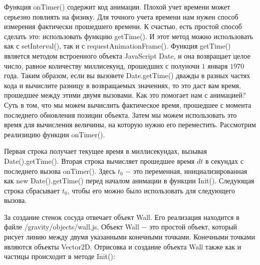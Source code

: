 Функция onTimer() содержит код анимации. Плохой учет времени может серьезно повлиять на физику. Для точного учета времени нам нужен способ измерения фактически прошедшего времени. К счастью, есть простой способ сделать это: использовать функцию getTime(). И этот метод можно использовать как с setInterval(), так и с requestAnimationFrame(). Функция getTime() является методом встроенного объекта JavaScript Date, и она возвращает целое число, равное количеству миллисекунд, прошедших с полуночи $1$ января $1970$ года. Таким образом, если вы вызовете Date.getTime() дважды в разных частях кода и вычислите разницу в возвращаемых значениях, то это даст вам время, прошедшее между этими двумя вызовами.
Как это помогает нам с анимацией? Суть в том, что мы можем вычислить фактическое время, прошедшее с момента последнего обновления позиции объекта. Затем мы можем использовать это время для вычисления величины, на которую нужно его переместить.
Рассмотрим реализицию функции onTimer().


Первая строка получает текущее время в миллисекундах, вызывая Date().getTime(). Вторая строка вычисляет прошедшее время $dt$ в секундах с последнего вызова onTimer(). Здесь $t_0$ $-$ это переменная, инициализированная как new Date().getTime() перед началом анимации в функции Init(). Следующая строка сбрасывает $t_0$, чтобы его можно было использовать для следующего вызова.

За создание стенок сосуда отвечает объект Wall. Его реализация находится в файле /gravity/objects/wall.js. Объект Wall $-$ это простой объект, который рисует линию между двумя указанными конечными точками. Конечными
точками являются объекты Vector2D. Отрисовка и создание объекта Wall также как и частицы происходит в методе Init():


